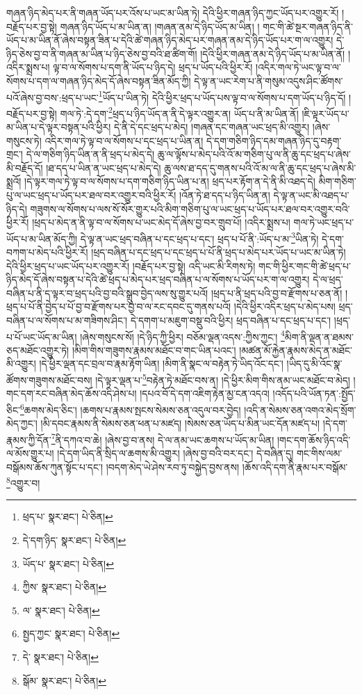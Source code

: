 གཞན་ཉིད་མེད་པར་ནི་གཞན་ཡོད་པར་འོས་པ་ཡང་མ་ཡིན་ཏེ། དེའི་ཕྱིར་གཞན་ཉིད་ཀྱང་ཡོད་པར་འགྱུར་རོ། །བརྗོད་པར་བྱ་སྟེ། གཞན་ཉིད་ཡོད་པ་མ་ཡིན་ན། །གཞན་ནམ་དེ་ཉིད་ཡོད་མ་ཡིན། །
གང་གི་ཚེ་སྔར་གཞན་ཉིད་ནི་ཡོད་པ་མ་ཡིན་ནོ་ཞེས་བསྟན་ཟིན་པ་དེའི་ཚེ་གཞན་ཉིད་མེད་པར་གཞན་ནམ་དེ་ཉིད་ཡོད་པར་ག་ལ་འགྱུར། དེ་ཉིད་ཅེས་བྱ་བ་ནི་གཞན་མ་ཡིན་པ་ཉིད་ཅེས་བྱ་བའི་ཐ་ཚིག་གོ། །དེའི་ཕྱིར་གཞན་ནམ་དེ་ཉིད་ཡོད་པ་མ་ཡིན་ནོ། །འདིར་སྨྲས་པ། ལྟ་བ་ལ་སོགས་པ་དག་ནི་ཡོད་པ་ཉིད་དེ། ཕྲད་པ་ཡོད་པའི་ཕྱིར་རོ། །འདིར་གལ་ཏེ་ཡང་ལྟ་བ་ལ་སོགས་པ་དག་ལ་གཞན་ཉིད་མེད་དོ་ཞེས་བསྟན་ཟིན་མོད་ཀྱི། དེ་ལྟ་ན་ཡང་རེག་པ་ནི་གསུམ་འདུས་ཤིང་ཚོགས་པའོ་ཞེས་བྱ་བས་:ཕྲད་པ་ཡང་\footnote{ཕྲད་པ་  སྣར་ཐང་།  པེ་ཅིན། }ཡོད་པ་ཡིན་ཏེ། དེའི་ཕྱིར་ཕྲད་པ་ཡོད་པས་ལྟ་བ་ལ་སོགས་པ་དག་ཡོད་པ་ཉིད་དོ། །བརྗོད་པར་བྱ་སྟེ། གལ་ཏེ་:དེ་དག་\footnote{དེ་དག་ཉིད་  སྣར་ཐང་།  པེ་ཅིན། }ཕྲད་པ་ཉིད་ཡོད་ན་ནི་དེ་ལྟར་འགྱུར་ན། ཡོད་པ་ནི་མ་ཡིན་ནོ། །ཇི་ལྟར་ཡོད་པ་མ་ཡིན་པ་དེ་ལྟར་བསྟན་པའི་ཕྱིར། དེ་ནི་དེ་དང་ཕྲད་པ་མེད། །གཞན་དང་གཞན་ཡང་ཕྲད་མི་འགྱུར། །ཞེས་གསུངས་ཏེ། འདིར་གལ་ཏེ་ལྟ་བ་ལ་སོགས་པ་དང་ཕྲད་པ་ཡིན་ན། དེ་དག་གཅིག་ཉིད་དམ་གཞན་ཉིད་དུ་བརྟག་གྲང་། དེ་ལ་གཅིག་ཉིད་ཡིན་ན་ནི་ཕྲད་པ་མེད་དེ། ཆུ་ལ་ལྟོས་པ་མེད་པའི་འོ་མ་གཅིག་པུ་ལ་ནི་ཆུ་དང་ཕྲད་པ་ཞེས་མི་བརྗོད་དོ། །ཐ་དད་པ་ཡིན་ན་ཡང་ཕྲད་པ་མེད་དེ། ཆུ་ལས་ཐ་དད་དུ་གནས་པའི་འོ་མ་ལ་ནི་ཆུ་དང་ཕྲད་པ་ཞེས་མི་སྨྲའོ། །དེ་ལྟར་གལ་ཏེ་ལྟ་བ་ལ་སོགས་པ་དག་གཅིག་ཉིད་ཡིན་པ་ན། ཕྲད་པར་རྟོག་ན་དེ་ནི་མི་འཐད་དེ། མིག་གཅིག་པུ་ལ་ཡང་ཕྲད་པ་ཡོད་པར་ཐལ་བར་འགྱུར་བའི་ཕྱིར་རོ། །འོན་ཏེ་ཐ་དད་པ་ཉིད་ཡིན་ན། དེ་ལྟ་ན་ཡང་མི་འཐད་པ་ཉིད་དེ། གཟུགས་ལ་སོགས་པ་ལས་སོ་སོར་གྱུར་པའི་མིག་གཅིག་པུ་ལ་ཡང་ཕྲད་པ་ཡོད་པར་ཐལ་བར་འགྱུར་བའི་ཕྱིར་རོ། །ཕྲད་པ་མེད་ན་ནི་ལྟ་བ་ལ་སོགས་པ་ཡང་མེད་དོ་ཞེས་བྱ་བར་གྲུབ་པོ། །འདིར་སྨྲས་པ། གལ་ཏེ་ཡང་ཕྲད་པ་ཡོད་པ་མ་ཡིན་མོད་ཀྱི། དེ་ལྟ་ན་ཡང་ཕྲད་བཞིན་པ་དང་ཕྲད་པ་དང་། ཕྲད་པ་པོ་ནི་:ཡོད་པ་མ་\footnote{ཡོད་པ་  སྣར་ཐང་།  པེ་ཅིན། }ཡིན་ཏེ། དེ་དག་བཀག་པ་མེད་པའི་ཕྱིར་རོ། །ཕྲད་བཞིན་པ་དང་ཕྲད་པ་དང་ཕྲད་པ་པོ་ནི་ཕྲད་པ་མེད་པར་ཡོད་པ་ཡང་མ་ཡིན་ཏེ། དེའི་ཕྱིར་ཕྲད་པ་ཡང་ཡོད་པར་འགྱུར་རོ། །བརྗོད་པར་བྱ་སྟེ། འདི་ཡང་མི་རིགས་ཏེ། གང་གི་ཕྱིར་གང་གི་ཚེ་ཕྲད་པ་ཉིད་མེད་དོ་ཞེས་བསྟན་པ་དེའི་ཚེ་ཕྲད་པ་མེད་པར་ཕྲད་བཞིན་པ་ལ་སོགས་པ་ཡོད་པར་ག་ལ་འགྱུར། དེ་ལ་ཕྲད་བཞིན་པ་ནི་ད་ལྟར་བ་ཕྲད་པའི་བྱ་བའི་སྒྲུབ་བྱེད་ལས་སུ་གྱུར་པའོ། །ཕྲད་པ་ནི་ཕྲད་པའི་བྱ་བ་རྫོགས་པ་ཅན་ནོ། །ཕྲད་པ་པོ་ནི་བྱེད་པ་པོ་བྱ་བ་རྫོགས་པར་བྱ་བ་ལ་རང་དབང་དུ་གནས་པའོ། །དེའི་ཕྱིར་འདིར་ཕྲད་པ་མེད་པས། ཕྲད་བཞིན་པ་ལ་སོགས་པ་མ་གཟིགས་ཤིང་། དེ་དགག་པ་མཇུག་བསྡུ་བའི་ཕྱིར། ཕྲད་བཞིན་པ་དང་ཕྲད་པ་དང་། །ཕྲད་པ་པོ་ཡང་ཡོད་མ་ཡིན། །ཞེས་གསུངས་སོ། །དེ་ཉིད་ཀྱི་ཕྱིར། བཅོམ་ལྡན་འདས་:ཀྱིས་ཀྱང་། \footnote{ཀྱིས་  སྣར་ཐང་།  པེ་ཅིན། }མིག་ནི་ལྡན་ན་ཐམས་ཅད་མཐོང་འགྱུར་ཏེ། །མིག་གིས་གཟུགས་རྣམས་མཐོང་བ་གང་ཡིན་པའང་། །མཚན་མོ་རྐྱེན་རྣམས་མེད་ན་མཐོང་མི་འགྱུར། །དེ་ཕྱིར་ལྡན་དང་བྲལ་བ་རྣམ་རྟོག་ཡིན། །མིག་ནི་སྣང་ལ་བརྟེན་ཏེ་ཡིད་འོང་དང་། །ཡིད་དུ་མི་འོང་སྣ་ཚོགས་གཟུགས་མཐོང་བས། །དེ་ལྟར་ལྡན་པ་\footnote{ལ་  སྣར་ཐང་།  པེ་ཅིན། }བརྟེན་ཏེ་མཐོང་བས་ན། །དེ་ཕྱིར་མིག་གིས་ནམ་ཡང་མཐོང་བ་མེད། །གང་དག་རང་བཞིན་མེད་ཆོས་འདི་ཤེས་པ། །དཔའ་བོ་དེ་དག་འཇིག་རྟེན་མྱ་ངན་འདའ། །འདོད་པའི་ཡོན་ཏན་:སྤྱོད་ཅིང་\footnote{སྤྱད་ཀྱང་  སྣར་ཐང་།  པེ་ཅིན། }ཆགས་མེད་ཅིང་། །ཆགས་པ་རྣམས་སྤངས་སེམས་ཅན་འདུལ་བར་བྱེད། །འདི་ན་སེམས་ཅན་འགའ་མེད་སྲོག་མེད་ཀྱང་། །མི་དབང་རྣམས་ནི་སེམས་ཅན་ཕན་པ་མཛད། །སེམས་ཅན་ཡོད་པ་མིན་ཡང་དོན་མཛད་པ། །དེ་དག་རྣམས་ཀྱི་དོན་\footnote{དེ་  སྣར་ཐང་།  པེ་ཅིན། }ནི་དཀའ་བ་ཆེ། །ཞེས་བྱ་བ་ནས། དེ་ལ་ནམ་ཡང་ཆགས་པ་ཡོད་མ་ཡིན། །གང་དག་ཆོས་ཉིད་འདི་ལ་མོས་གྱུར་པ། །དེ་དག་ཡིད་ནི་སྲིད་ལ་ཆགས་མི་འགྱུར། །ཞེས་བྱ་བའི་བར་དང་། དེ་བཞིན་དུ། གང་གིས་ལམ་བསྒོམས་ཆོས་ཀུན་སྟོང་པ་དང་། །བདག་མེད་ཡེ་ཤེས་རབ་ཏུ་བསྐྱེད་བྱས་ནས། །ཆོས་འདི་དག་ནི་རྣམ་པར་བསྒོམ་\footnote{སྒོམ་  སྣར་ཐང་།  པེ་ཅིན། }འགྱུར་བ། 